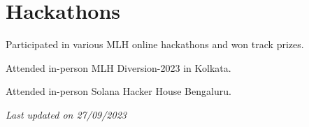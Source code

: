 \documentclass[a4paper,11pt]{article}
\begin{document}
\section{Hackathons}
\begin{description}[font=$\bullet$]
\item {\normalsize Participated in various MLH online hackathons and won track prizes.}
\vspace{-5pt}
\item {\normalsize Attended in-person MLH Diversion-2023 in Kolkata.}
\vspace{-5pt}
\item {\normalsize Attended in-person Solana Hacker House Bengaluru.}
\vspace{-5pt}
\end{description}
\vspace{-5pt}
{\hfill \textit{Last updated on 27/09/2023}}
\end{document}
